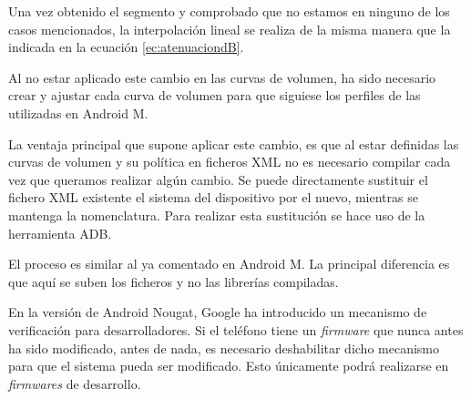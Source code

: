 Una vez obtenido el segmento y comprobado que no estamos en ninguno de los casos mencionados, la interpolación lineal se realiza de la misma manera que la indicada en la ecuación \ref{ec:atenuaciondB}.

Al no estar aplicado este cambio en las curvas de volumen, ha sido necesario crear y ajustar cada curva de volumen para que siguiese los perfiles de las utilizadas en Android M. 

La ventaja principal que supone aplicar este cambio, es que al estar definidas las curvas de volumen y su política en ficheros XML no es necesario compilar cada vez que queramos realizar algún cambio. Se puede directamente sustituir el fichero XML existente el sistema del dispositivo por el nuevo, mientras se mantenga la nomenclatura. Para realizar esta sustitución se hace uso de la herramienta \gls{ADB}. 

El proceso es similar al ya comentado en Android M. La principal diferencia es que aquí se suben los ficheros y no las librerías compiladas.

En la versión de Android Nougat, Google ha introducido un mecanismo de verificación para desarrolladores. Si el teléfono tiene un \textit{firmware} que nunca antes ha sido modificado, antes de nada, es necesario deshabilitar dicho mecanismo para que el sistema pueda ser modificado. Esto únicamente podrá realizarse en \textit{firmwares} de desarrollo. 
